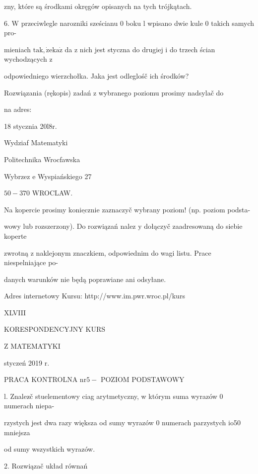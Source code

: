 \documentclass[a4paper,12pt]{article}
\begin{document}
zny, które są środkami okręgów opisanych na tych trójkątach.

6. $\mathrm{W}$ przeciwlegle narozniki sześcianu $0$ boku l wpisano dwie kule $0$ takich samych pro-

mieniach $\mathrm{t}\mathrm{a}\mathrm{k}, \dot{\mathrm{z}}\mathrm{e}\mathrm{k}\mathrm{a}\dot{\mathrm{z}}$ da $\mathrm{z}$ nich jest styczna do drugiej $\mathrm{i}$ do trzech ścian wychodzących $\mathrm{z}$

odpowiedniego wierzchołka. Jaka jest odleglośč ich środków?

Rozwiązania (rękopis) zadań z wybranego poziomu prosimy nadsylač do

na adres:

18 stycznia 20l8r.

Wydziaf Matematyki

Politechnika Wrocfawska

Wybrzez $\mathrm{e}$ Wyspiańskiego 27

$50-370$ WROCLAW.

Na kopercie prosimy $\underline{\mathrm{k}\mathrm{o}\mathrm{n}\mathrm{i}\mathrm{e}\mathrm{c}\mathrm{z}\mathrm{n}\mathrm{i}\mathrm{e}}$ zaznaczyč wybrany poziom! (np. poziom podsta-

wowy lub rozszerzony). Do rozwiązań nalez $\mathrm{y}$ dołączyč zaadresowaną do siebie koperte

zwrotną $\mathrm{z}$ naklejonym znaczkiem, odpowiednim do wagi listu. Prace niespelniające po-

danych warunków nie będą poprawiane ani odsyłane.

Adres internetowy Kursu: http://www.im.pwr.wroc.pl/kurs







XLVIII

KORESPONDENCYJNY KURS

Z MATEMATYKI

styczeń 2019 r.

PRACA KONTROLNA $\mathrm{n}\mathrm{r} 5-$ POZIOM PODSTAWOWY

l. Znalez$\acute{}$č stuelementowy ciag arytmetyczny, w którym suma wyrazów 0 numerach niepa-

rzystych jest dwa razy większa od sumy wyrazów 0 numerach parzystych io50 mniejsza

od sumy wszystkich wyrazów.

2. Rozwiązač układ równań 
\end{document}
